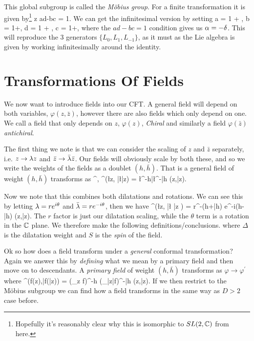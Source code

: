 This global subgroup is called the \textit{M\"{o}bius group}. For a finite transformation it is given by\footnote{Hopefully it's reasonably clear why this is isomorphic to $SL(2,\mathbb{C})$ from here.}
\bse 
    z \mapsto {} \qquad {} \qquad ad-bc = 1.
\ese 
We can get the infinitesimal version by setting
\bse 
    a = 1 + \a, \qquad b = 1+\beta, \qquad d = 1 + \del, \qand c = 1+\g, 
\ese 
where the $ad-bc=1$ condition gives us $\alpha = - \delta$. This will reproduce the 3 generators $\{L_0,L_1,L_{-1}\}$, as it must as the Lie algebra is given by working infinitesimally around the identity. 

\section{Transformations Of Fields}

We now want to introduce fields into our CFT. A general field will depend on both variables, $\varphi(z,\bar{z})$, however there are also fields which only depend on one. We call a field that only depends on $z$, $\varphi(z)$, \textit{Chiral} and similarly a field $\varphi(\bar{z})$ \textit{antichiral}.

The first thing we note is that we can consider the scaling of $z$ and $\bar{z}$ separately, i.e. $z\to \lambda z$ and $\bar{z}\to \bar{\lambda}\bar{z}$. Our fields will obviously scale by both these, and so we write the weights of the fields as a doublet $(h,\bar{h})$. That is a general field of weight $(h,\bar{h})$ transforms as
\bse 
    \varphi \to \varphi^{\prime}, \qquad \varphi^{\prime}(\l z, \bar{\l}\bar{z}) = \l^{-h}\bar{\l}^{-\bar{h}} \varphi(z,\bar{z}). 
\ese 

Now we note that this combines both dilatations and rotations. We can see this by letting $\lambda = re^{i\theta}$ and $\bar{\lambda} = r e^{-i\theta}$, then we have
\bse 
    \varphi^{\prime}(\l z, \bar{\l} \bar{z} ) = r^{-(h+\bar{h})} e^{-i\theta(h-\bar{h})} \varphi(z,\bar{z}).
\ese
The $r$ factor is just our dilatation scaling, while the $\theta$ term is a rotation in the $\mathbb{C}$ plane. We therefore make the following definitions/conclusions. 
\noindent where $\Delta$ is the dilatation weight and $S$ is the \textit{spin} of the field. 

Ok so how does a field transform under a \textit{general} conformal transformation? Again we answer this by \textit{defining} what we mean by a primary field and then move on to descendants. 
    A \textit{primary field} of weight $(h,\bar{h})$ transforms as $\varphi\to\varphi^{\prime}$ where 
    \be 
    \label{eqn:PrimaryField2D}
        \varphi^{\prime}\big(f(z),\bar{f}(\bar{z})\big) = \big(\p_z f\big)^{-h} \big(\p_{\bar{z}}\bar{f}\big)^{-\bar{h}} \varphi(z,\bar{z}).
    \ee 
\ed 
\noindent If we then restrict to the M\"{o}bius subgroup we can find how a field transforms in the same way as $D>2$ case before. 

